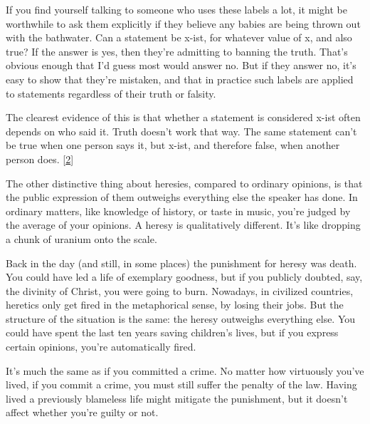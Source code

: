 If
                  you find yourself talking to someone who uses these labels a
                  lot, it might be worthwhile to ask them explicitly if they
                  believe any babies are being thrown out with the bathwater.
                  Can a statement be x-ist, for whatever value of x, and also
                  true? If the answer is yes, then they're admitting to banning
                  the truth. That's obvious enough that I'd guess most would
                  answer no. But if they answer no, it's easy to show that
                  they're mistaken, and that in practice such labels are applied
                  to statements regardless of their truth or falsity.

The
                  clearest evidence of this is that whether a statement is
                  considered x-ist often depends on who said it. Truth doesn't
                  work that way. The same statement can't be true when one
                  person says it, but x-ist, and therefore false, when another
                  person does.
                  [\href{\#f2n}{2}]

The other distinctive thing about heresies,
                  compared to ordinary opinions, is that the public expression
                  of them outweighs everything else the speaker has done. In
                  ordinary matters, like knowledge of history, or taste in
                  music, you're judged by the average of your opinions. A heresy
                  is qualitatively different. It's like dropping a chunk of
                  uranium onto the scale.

Back in the day (and still,
                  in some places) the punishment for heresy was death. You could
                  have led a life of exemplary goodness, but if you publicly
                  doubted, say, the divinity of Christ, you were going to burn.
                  Nowadays, in civilized countries, heretics only get fired in
                  the metaphorical sense, by losing their jobs. But the
                  structure of the situation is the same: the heresy outweighs
                  everything else. You could have spent the last ten years
                  saving children's lives, but if you express certain opinions,
                  you're automatically fired.

It's much the same as
                  if you committed a crime. No matter how virtuously you've
                  lived, if you commit a crime, you must still suffer the
                  penalty of the law. Having lived a previously blameless life
                  might mitigate the punishment, but it doesn't affect whether
                  you're guilty or not.

